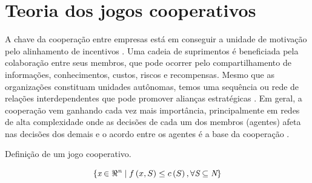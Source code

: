 \documentclass[
	article,			        %
	11pt,				          %
	oneside,			        %
	a4paper,			        %
	english,			        %
	brazil,				        %
	sumario=tradicional
]{abntex2}\usepackage[]{graphicx}\usepackage[]{color}
\begin{document}
\section{Teoria dos jogos cooperativos}

A chave da cooperação entre empresas está em conseguir a unidade de motivação pelo alinhamento de incentivos \cite{Cao.2012}. Uma cadeia de suprimentos é beneficiada pela colaboração entre seus membros, que pode ocorrer pelo compartilhamento de informações, conhecimentos, custos, riscos e recompensas. Mesmo que as organizações constituam unidades autônomas, temos uma sequência ou rede de relações interdependentes que pode promover alianças estratégicas \cite{Chen.2004}. Em geral, a cooperação vem ganhando cada vez mais importância, principalmente em redes de alta complexidade \cite{Drechsel.2010} onde as decisões de cada um dos membros (agentes) afeta nas decisões dos demais e o acordo entre os agentes é a base da cooperação \cite{Young.1994}.

Definição de um jogo cooperativo.

\begin{equation}
  \label{eq:conceitoTJC}
  \left \{ 
    \emph{x} \in \Re^{\emph{n}} \mid f\left ( x,S \right ) \leq c\left ( S \right ), \forall \emph{S} \subseteq \emph{N}
  \right\}
\end{equation}
\end{document}
